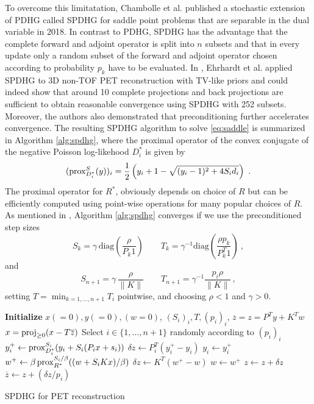 To overcome this limitatation, Chambolle et al. published a stochastic extension of PDHG called SPDHG 
for saddle point problems that are separable in the dual variable \cite{Chambolle2018} in 2018.
In contrast to PDHG, SPDHG has the advantage that the complete forward and adjoint operator is 
split into $n$ subsets and that in every update only a random subset of the forward
and adjoint operator chosen according to probability $p_k$ have to be evaluated.
In \cite{Ehrhardt2019}, Ehrhardt et al. applied SPDHG to 3D non-TOF PET reconstruction with TV-like
priors and could indeed show that around 10 complete projections and back projections are sufficient 
to obtain reasonable convergence using SPDHG with 252 subsets.
Moreover, the authors also demonstrated that preconditioning further accelerates convergence.
The resulting SPDHG algorithm to solve \eqref{eq:saddle} is summarized in Algorithm \ref{alg:spdhg},
where the proximal operator of the convex conjugate of the negative Poisson log-likehood $D_i^*$ 
is given by
%
\begin{equation}
(\operatorname{prox}_{D_i^*}^{S}(y))_i = \frac{1}{2} \left(y_i + 1 - \sqrt{ (y_i-1)^2 + 4 S_i d_i} \right) \ .
\label{eq:proxD}
\end{equation} 
%
The proximal operator for $R^*$, obviously depends on choice of $R$ but can be efficiently 
computed using point-wise operations for many popular choices of $R$.
As mentioned in \cite{Ehrhardt2019}, Algorithm \ref{alg:spdhg} converges if we use the preconditioned
step sizes
%
\[ S_k = \gamma \, \text{diag}(\frac{\rho}{P_k 1} )\qquad  T_k = \gamma^{-1} \text{diag}(\frac{\rho p_k}{P^T_k 1}) \ , \]
% 
and
%
\[ S_{n+1} = \gamma \, \frac{\rho}{\|K\|} \qquad T_{n+1} = \gamma^{-1} \frac{p_i\rho}{\|K\|} \ , \]
%
setting $T = \min_{k=1,\ldots,n+1} T_i$ pointwise, and choosing $\rho<1$ and $\gamma>0$.
%
\begin{algorithm}[t]
\begin{algorithmic}[1]
\small
\State \textbf{Initialize} $x(=0),y(=0),(w=0)$, $(S_i)_i,T,(p_i)_i$,
\State $\overline{z} = z = P^T y + K^T w$
\Repeat
	\State $x = \operatorname{proj}_{\geq 0} (x - T \overline{z})$
	\State Select $i \in \{ 1,\ldots,n+1\} $ randomly according to $(p_i)_i$
	\State $y_i^+ \gets \operatorname{prox}_{D_i^*}^{S_i} ( y_i + S_i  ( P_i x + s_i))$
	\State $\delta z \gets P_i^T (y_i^+ - y_i)$
	\State $y_i \gets y_i^+$
  \Else
	\State $w^+ \gets \beta \operatorname{prox}_{R^*}^{S_i/\beta} ((w + S_i  K x)/\beta)$
	\State $\delta z \gets K^T (w^+ - w)$
	\State $w \gets w^+$
  \EndIf
	\State $z \gets z + \delta z$
	\State $\overline{z} \gets  z + (\delta z/p_i)$
\State {}
\end{algorithmic}
\caption{SPDHG for PET reconstruction \cite{Ehrhardt2019}}
\label{alg:spdhg}
\end{algorithm}
%

